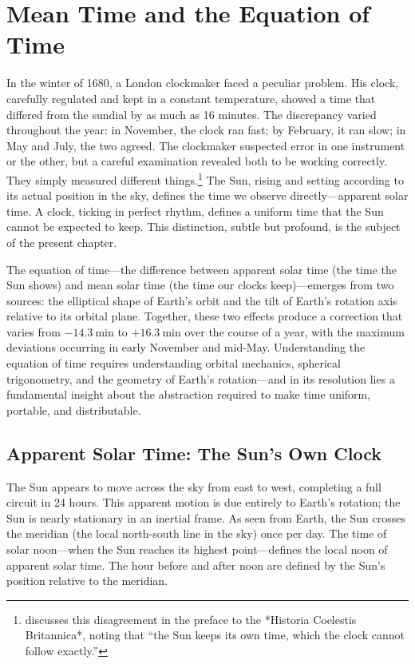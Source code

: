 \chapter{Mean Time and the Equation of Time}
\label{ch:mean-time}

In the winter of 1680, a London clockmaker faced a peculiar problem. His clock, carefully regulated and kept in a constant temperature, showed a time that differed from the sundial by as much as 16 minutes. The discrepancy varied throughout the year: in November, the clock ran fast; by February, it ran slow; in May and July, the two agreed. The clockmaker suspected error in one instrument or the other, but a careful examination revealed both to be working correctly. They simply measured different things.\footnote{\textcite{Flamsteed1725} discusses this disagreement in the preface to the *Historia Coelestis Britannica*, noting that ``the Sun keeps its own time, which the clock cannot follow exactly.''} The Sun, rising and setting according to its actual position in the sky, defines the time we observe directly—apparent solar time. A clock, ticking in perfect rhythm, defines a uniform time that the Sun cannot be expected to keep. This distinction, subtle but profound, is the subject of the present chapter.

The equation of time—the difference between apparent solar time (the time the Sun shows) and mean solar time (the time our clocks keep)—emerges from two sources: the elliptical shape of Earth's orbit and the tilt of Earth's rotation axis relative to its orbital plane. Together, these two effects produce a correction that varies from $-\SI{14.3}{\minute}$ to $+\SI{16.3}{\minute}$ over the course of a year, with the maximum deviations occurring in early November and mid-May. Understanding the equation of time requires understanding orbital mechanics, spherical trigonometry, and the geometry of Earth's rotation—and in its resolution lies a fundamental insight about the abstraction required to make time uniform, portable, and distributable.

\section{Apparent Solar Time: The Sun's Own Clock}

The Sun appears to move across the sky from east to west, completing a full circuit in 24 hours. This apparent motion is due entirely to Earth's rotation; the Sun is nearly stationary in an inertial frame. As seen from Earth, the Sun crosses the meridian (the local north-south line in the sky) once per day. The time of solar noon—when the Sun reaches its highest point—defines the local noon of apparent solar time. The hour before and after noon are defined by the Sun's position relative to the meridian.


